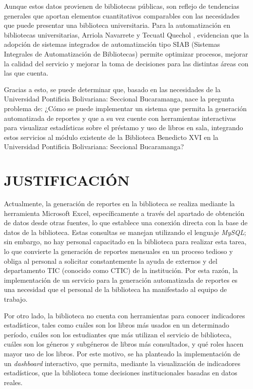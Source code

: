 \documentclass[spanish]{ieee_upb}
\begin{document}
\vspace{0.3cm}
Aunque estos datos provienen de bibliotecas públicas, son reflejo de tendencias generales que aportan elementos cuantitativos comparables con las necesidades que puede presentar una biblioteca universitaria. Para la automatización en bibliotecas universitarias, Arriola Navarrete y Tecuatl Quechol \cite{Arriola2011}, evidencian que la adopción de sistemas integrados de automatización tipo SIAB (Sistemas Integrales de Automatización de Bibliotecas) permite optimizar procesos, mejorar la calidad del servicio y mejorar la toma de decisiones para las distintas áreas con las que cuenta.

\vspace{0.3cm}
Gracias a esto, se puede determinar que, basado en las necesidades de la Universidad Pontificia Bolivariana: Seccional Bucaramanga, nace la pregunta problema de: ¿Cómo se puede implementar un sistema que permita la generación automatizada de reportes y que a su vez cuente con herramientas interactivas para visualizar estadísticas sobre el préstamo y uso de libros en sala, integrando estos servicios al módulo existente de la Biblioteca Benedicto XVI en la Universidad Pontificia Bolivariana: Seccional Bucaramanga?

\newpage
\section{JUSTIFICACIÓN}
Actualmente, la generación de reportes en la biblioteca se realiza mediante la herramienta Microsoft Excel, específicamente a través del apartado de obtención de datos desde otras fuentes, lo que establece una conexión directa con la base de datos de la biblioteca. Estas consultas se manejan utilizando el lenguaje \textit{MySQL}; sin embargo, no hay personal capacitado en la biblioteca para realizar esta tarea, lo que convierte la generación de reportes mensuales en un proceso tedioso y obliga al personal a solicitar constantemente la ayuda de externos y del departamento TIC (conocido como CTIC) de la institución. Por esta razón, la implementación de un servicio para la generación automatizada de reportes es una necesidad que el personal de la biblioteca ha manifestado al equipo de trabajo.

Por otro lado, la biblioteca no cuenta con herramientas para conocer indicadores estadísticos, tales como cuáles son los libros más usados en un determinado período, cuáles son los estudiantes que más utilizan el servicio de biblioteca, cuáles son los géneros y subgéneros de libros más consultados, y qué roles hacen mayor uso de los libros. Por este motivo, se ha planteado la implementación de un \textit{dashboard} interactivo, que permita, mediante la visualización de indicadores estadísticos, que la biblioteca tome decisiones institucionales basadas en datos reales.
\end{document}
